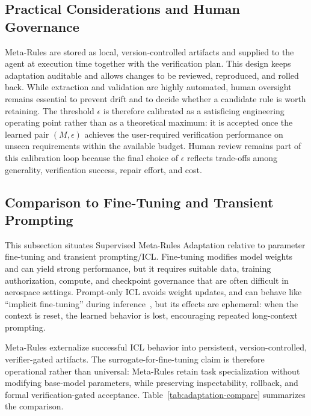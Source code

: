 \documentclass[conference]{IEEEtran}
\begin{document}
\subsection{Practical Considerations and Human Governance}
Meta-Rules are stored as local, version-controlled artifacts and supplied to the agent at execution time together with the verification plan. This design keeps adaptation auditable and allows changes to be reviewed, reproduced, and rolled back. While extraction and validation are highly automated, human oversight remains essential to prevent drift and to decide whether a candidate rule is worth retaining. The threshold $\epsilon$ is therefore calibrated as a satisficing engineering operating point rather than as a theoretical maximum: it is accepted once the learned pair $(M,\epsilon)$ achieves the user-required verification performance on unseen requirements within the available budget. Human review remains part of this calibration loop because the final choice of $\epsilon$ reflects trade-offs among generality, verification success, repair effort, and cost.

\subsection{Comparison to Fine-Tuning and Transient Prompting}
\label{sec:comparison}

This subsection situates Supervised Meta-Rules Adaptation relative to parameter fine-tuning and transient prompting/ICL. Fine-tuning modifies model weights and can yield strong performance, but it requires suitable data, training authorization, compute, and checkpoint governance that are often difficult in aerospace settings. Prompt-only ICL avoids weight updates, and can behave like ``implicit fine-tuning'' during inference~\cite{vonoswald2023transformers}, but its effects are ephemeral: when the context is reset, the learned behavior is lost, encouraging repeated long-context prompting.

Meta-Rules externalize successful ICL behavior into persistent, version-controlled, verifier-gated artifacts. The surrogate-for-fine-tuning claim is therefore operational rather than universal: Meta-Rules retain task specialization without modifying base-model parameters, while preserving inspectability, rollback, and formal verification-gated acceptance. Table~\ref{tab:adaptation-compare} summarizes the comparison.
\end{document}
